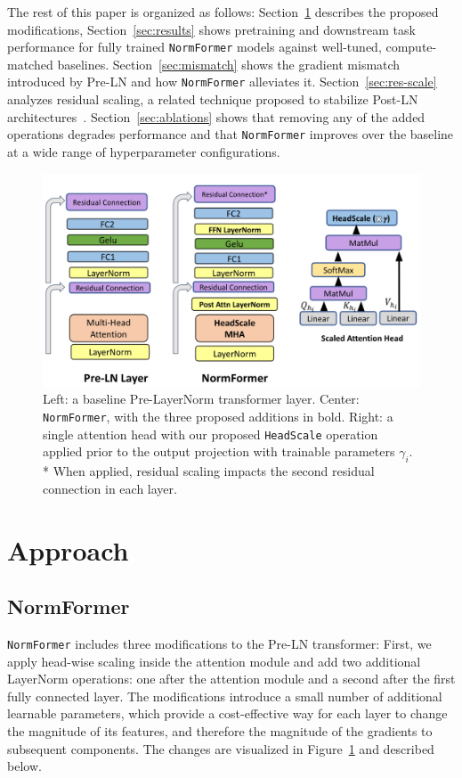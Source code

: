 \documentclass{article} %
\begin{document}
The rest of this paper is organized as follows: Section~\ref{sec:approach} describes the proposed modifications, Section~\ref{sec:results} shows pretraining and downstream task performance for fully trained \texttt{NormFormer} models against well-tuned, compute-matched baselines. Section~\ref{sec:mismatch} shows the gradient mismatch introduced by Pre-LN and how \texttt{NormFormer} alleviates it. Section~\ref{sec:res-scale} analyzes residual scaling, a related technique proposed to stabilize Post-LN architectures~\citep{xiong2020layer,zhu2021gradinit}. Section~\ref{sec:ablations} shows that removing any of the added operations degrades performance and that \texttt{NormFormer} improves over the baseline at a wide range of hyperparameter configurations.
\begin{figure}[t]
\begin{center}
\includegraphics[scale=0.25]{nf_arch_v4.jpg}
\caption{Left: a baseline Pre-LayerNorm transformer layer. Center: \texttt{NormFormer}, with the three proposed additions in bold. Right: a single attention head with our proposed \texttt{HeadScale} operation applied prior to the output projection with trainable parameters $\gamma_i$. * When applied, residual scaling impacts the second residual connection in each layer.}
\label{fig:arch}
\end{center}
\end{figure}
\section{Approach}
\label{sec:approach}
\subsection{NormFormer}
\texttt{NormFormer} includes three modifications to the Pre-LN transformer: First, we apply head-wise scaling inside the attention module and add two additional LayerNorm operations: one after the attention module and a second after the first fully connected layer.
The modifications introduce a small number of additional learnable parameters, which provide a cost-effective way for each layer to change the magnitude of its features, and therefore the magnitude of the gradients to subsequent components.
The changes are visualized in Figure~\ref{fig:arch} and described below.
\end{document}
